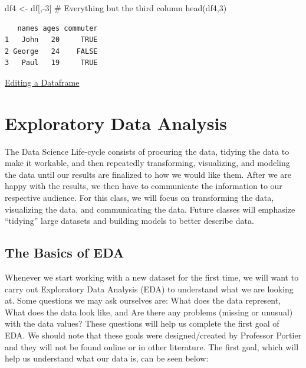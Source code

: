\documentclass[
  letterpaper,
  DIV=11,
  numbers=noendperiod]{scrreprt}
\newenvironment{Shaded}{\begin{snugshade}}{\end{snugshade}}
\newcommand{\CommentTok}[1]{\textcolor[rgb]{0.37,0.37,0.37}{#1}}
\newcommand{\DecValTok}[1]{\textcolor[rgb]{0.68,0.00,0.00}{#1}}
\newcommand{\FunctionTok}[1]{\textcolor[rgb]{0.28,0.35,0.67}{#1}}
\newcommand{\NormalTok}[1]{\textcolor[rgb]{0.00,0.23,0.31}{#1}}
\newcommand{\OtherTok}[1]{\textcolor[rgb]{0.00,0.23,0.31}{#1}}
\newcommand{\SpecialCharTok}[1]{\textcolor[rgb]{0.37,0.37,0.37}{#1}}
\begin{document}
\begin{Shaded}
\begin{Highlighting}[]
\NormalTok{df4 }\OtherTok{\textless{}{-}}\NormalTok{ df[,}\SpecialCharTok{{-}}\DecValTok{3}\NormalTok{] }\CommentTok{\# Everything but the third column}
\FunctionTok{head}\NormalTok{(df4,}\DecValTok{3}\NormalTok{)}
\end{Highlighting}
\end{Shaded}

\begin{verbatim}
   names ages commuter
1   John   20     TRUE
2 George   24    FALSE
3   Paul   19     TRUE
\end{verbatim}

\begin{watch}{}{}
    \href{https://youtu.be/us5M1ekgwUE}{Editing a Dataframe}
\end{watch}


\chapter{Exploratory Data Analysis}\label{exploratory-data-analysis}

The Data Science Life-cycle consists of procuring the data, tidying the
data to make it workable, and then repeatedly transforming, visualizing,
and modeling the data until our results are finalized to how we would
like them. After we are happy with the results, we then have to
communicate the information to our respective audience. For this class,
we will focus on transforming the data, visualizing the data, and
communicating the data. Future classes will emphasize ``tidying'' large
datasets and building models to better describe data.

\section{The Basics of EDA}\label{the-basics-of-eda}

Whenever we start working with a new dataset for the first time, we will
want to carry out Exploratory Data Analysis (EDA) to understand what we
are looking at. Some questions we may ask ourselves are: What does the
data represent, What does the data look like, and Are there any problems
(missing or unusual) with the data values? These questions will help us
complete the first goal of EDA. We should note that these goals were
designed/created by Professor Portier and they will not be found online
or in other literature. The first goal, which will help us understand
what our data is, can be seen below:
\end{document}
